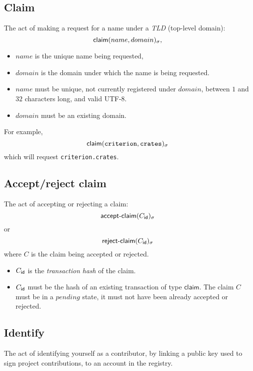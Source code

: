 \subsection{Claim}
The act of making a request for a name under a \emph{TLD} (top-level domain):
\[
    \mathsf{claim}\lparen name, domain\rparen_\sigma,
\]
\begin{itemize}
    \item $name$ is the unique name being requested,
    \item $domain$ is the domain under which the name is being requested.
\end{itemize}
\validation
\begin{itemize}
    \item $name$ must be unique, \ie not currently registered under $domain$,
        between $1$ and $32$ characters long, and valid UTF-8.
    \item $domain$ must be an existing domain.
\end{itemize}
For example,
\[
    \mathsf{claim}\lparen\mathtt{criterion}, \mathtt{crates}\rparen_\sigma
\]
which will request \texttt{criterion.crates}.

\subsection{Accept/reject claim}
The act of accepting or rejecting a claim:
\[
    \mathsf{accept\hbox{-}claim}\lparen C_{\mathsf{id}}\rparen_\sigma
\]
or
\[
    \mathsf{reject\hbox{-}claim}\lparen C_{\mathsf{id}}\rparen_\sigma
\]
where $C$ is the claim being accepted or rejected.

\begin{itemize}
    \item $C_{\mathsf{id}}$ is the \emph{transaction hash} of the claim.
\end{itemize}
\validation
\begin{itemize}
    \item $C_{\mathsf{id}}$ must be the hash of an existing transaction of
        type $\mathsf{claim}$.
        The claim $C$ must be in a $pending$ state, \ie it must not have
        been already accepted or rejected.
\end{itemize}

\subsection{Identify}
The act of identifying yourself as a contributor, by linking a public key used
to sign project contributions, to an account in the registry.

